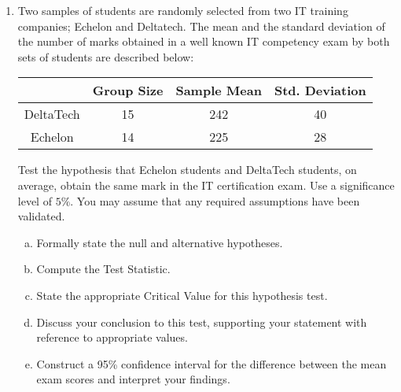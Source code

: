 \documentclass[a4paper,12pt]{article}
\begin{document}
\begin{enumerate}
\item Two samples of students are randomly selected from two IT training companies; Echelon and Deltatech. The mean and the standard deviation of the number of marks obtained in a well known IT competency exam by both sets of students are described below:\\

\begin{center}
\begin{tabular}{|c|c|c|c|}
  \hline
	& Group Size &	Sample Mean &	Std. Deviation\\ \hline
DeltaTech	& 15	& 242	& 40 \\
Echelon	& 14	& 225	& 28 \\
  \hline
\end{tabular}
\end{center}


Test the hypothesis that Echelon students and DeltaTech students, on average, obtain the same mark in the IT certification exam. Use a significance level of $5\%$. You may assume that any required assumptions have been validated.

\smallskip 
\begin{enumerate}[(a)]

\item Formally state the null and alternative hypotheses.
\item Compute the Test Statistic.
\item State the appropriate Critical Value for this hypothesis test.
\item Discuss your conclusion to this test, supporting your statement with reference to appropriate values.
\item Construct a 95\% confidence interval for the difference between the mean exam scores and interpret your findings. 
\end{enumerate}
\end{enumerate}
\end{document}
